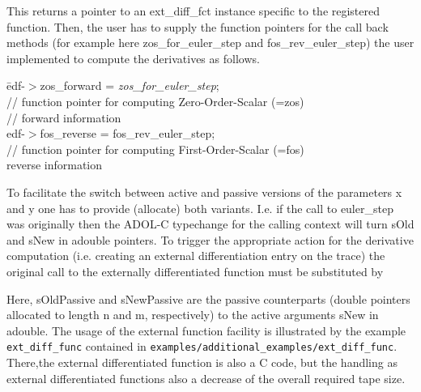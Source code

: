 \documentclass[11pt,twoside]{article}
\begin{document}
\noindent
This returns a pointer to an {\sf ext\_diff\_fct} instance specific to the registered function. 
Then, the user has to supply the function pointers for the call back methods (for example here 
{\sf zos\_for\_euler\_step} and {\sf  fos\_rev\_euler\_step}) the user implemented 
to compute the derivatives as follows.
\begin{tabbing}
\hspace*{2cm}\= {\sf edf-$>$zos\_forward = {\em zos\_for\_euler\_step};}\\
             \> {\sf // function pointer for computing
               Zero-Order-Scalar (=zos)}\\
             \> {\sf // forward information}\\
             \> {\sf edf-$>$fos\_reverse = fos\_rev\_euler\_step;} \\
             \> {\sf // function pointer for computing
               First-Order-Scalar (=fos)}\\ 
             \> {\sf reverse information}
\end{tabbing}
To facilitate the switch between active and passive versions of the parameters {\sf x} and {\sf y}
one has to provide (allocate) both variants. I.e. if the call to {\sf euler\_step} was originally
\noindent
\hspace*{2cm}{\sf rc=euler\_step(n, sOld, m, sNew);}
\medskip
then the ADOL-C typechange for the calling context will turn  {\sf sOld} and {\sf sNew} in {\sf adouble} pointers.
To trigger the appropriate action for the derivative computation (i.e. creating an external differentiation entry on the trace) 
the original call to the externally differentiated function 
must be substituted by 
\medskip

\noindent
\hspace*{2cm}{\sf rc=call\_ext\_fct(edf, n, sOldPassive, sOld, m, sNewPassive, sNew);}
\medskip

\noindent
Here, {\sf sOldPassive} and {\sf sNewPassive} are the passive counterparts ({\sf double} pointers allocated to length {\sf n} and {\sf m}, respectively)  
to the active arguments {\sf sNew} in {\sf adouble}.
The usage of the external function facility is illustrated by the
example \verb=ext_diff_func= contained in
\verb=examples/additional_examples/ext_diff_func=.
There,the external differentiated function is also a C code, but the
handling as external differentiated functions also a decrease of the
overall required tape size.
\end{document}
